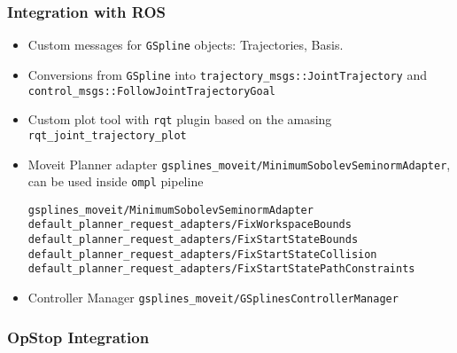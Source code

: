 \begin{frame}[fragile]
	\frametitle{Integration with ROS}
	\begin{itemize}
		\item Custom messages for \Verb|GSpline| objects: Trajectories, Basis.
		\item Conversions from \Verb|GSpline| into \Verb|trajectory_msgs::JointTrajectory| and \Verb|control_msgs::FollowJointTrajectoryGoal|
		\item Custom plot tool with \Verb|rqt| plugin based on the amasing \Verb|rqt_joint_trajectory_plot|
		\item Moveit Planner adapter \Verb|gsplines_moveit/MinimumSobolevSeminormAdapter|, can be used inside \Verb|ompl| pipeline
		      \begin{lstlisting}
gsplines_moveit/MinimumSobolevSeminormAdapter
default_planner_request_adapters/FixWorkspaceBounds
default_planner_request_adapters/FixStartStateBounds
default_planner_request_adapters/FixStartStateCollision
default_planner_request_adapters/FixStartStatePathConstraints
	          \end{lstlisting}
		\item  Controller Manager \Verb|gsplines_moveit/GSplinesControllerManager|
	\end{itemize}
\end{frame}


\begin{frame}[t]
	\frametitle{OpStop Integration}
	\begin{center}
	\end{center}
\end{frame}

